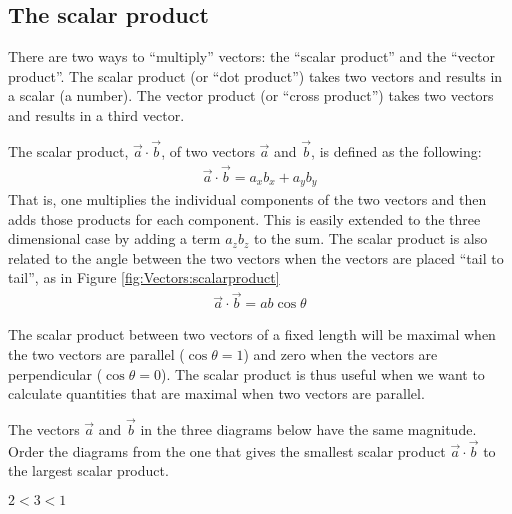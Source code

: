

\subsection{The scalar product}\label{sec:Vectors:scalarproduct}
There are two ways to ``multiply'' vectors: the ``scalar product'' and the ``vector product''. The scalar product (or ``dot product'') takes two vectors and results in a scalar (a number). The vector product (or ``cross product'') takes two vectors and results in a third vector. 

The scalar product, $\vec a \cdot \vec b$, of two vectors $\vec a$ and $\vec b$, is defined as the following:
\begin{align*}
\vec a \cdot \vec b=a_xb_x +a_yb_y
\end{align*}
That is, one multiplies the individual components of the two vectors and then adds those products for each component. This is easily extended to the three dimensional case by adding a term $a_zb_z$ to the sum. The scalar product is also related to the angle between the two vectors when the vectors are placed ``tail to tail'', as in Figure \ref{fig:Vectors:scalarproduct}
\begin{align*}
\vec a \cdot \vec b= ab\cos\theta
\end{align*}


The scalar product between two vectors of a fixed length will be maximal when the two vectors are parallel ($\cos\theta=1$) and zero when the vectors are perpendicular ($\cos\theta =0$). The scalar product is thus useful when we want to calculate quantities that are maximal when two vectors are parallel. 

\begin{checkpoint}
The vectors $\vec a $ and $\vec b$ in the three diagrams below have the same magnitude. Order the diagrams from the one that gives the smallest scalar product $\vec a\cdot \vec b$ to the largest scalar product.
\begin{answer}
$2<3<1$
\end{answer}
\end{checkpoint}


